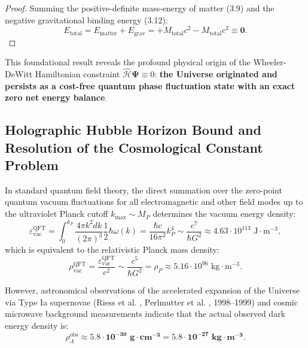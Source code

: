 \begin{proof}
Summing the positive-definite mass-energy of matter (3.9) and the negative gravitational binding energy (3.12):
\begin{equation}\label{eq:3.13}\tag{3.13}
E_{\text{total}} = E_{\text{matter}} + E_{\text{grav}} = +M_{\text{total}} c^2 - M_{\text{total}} c^2 \equiv \mathbf{0}.
\end{equation}
\end{proof}

This foundational result reveals the profound physical origin of the Wheeler-DeWitt Hamiltonian constraint $\hat{\mathcal{H}} \mathbf{\Psi} \equiv 0$: \textbf{the Universe originated and persists as a cost-free quantum phase fluctuation state with an exact zero net energy balance}.

\subsection{Holographic Hubble Horizon Bound and Resolution of the Cosmological Constant Problem}\label{sec:3.3}

In standard quantum field theory, the direct summation over the zero-point quantum vacuum fluctuations for all electromagnetic and other field modes up to the ultraviolet Planck cutoff $k_{\max} \sim M_P$ determines the vacuum energy density:
\begin{equation}\label{eq:3.14}\tag{3.14}
\varepsilon_{\text{vac}}^{\text{QFT}} = \int_0^{k_P} \frac{4\pi k^2 dk}{(2\pi)^3} \frac{1}{2}\hbar \omega(k) = \frac{\hbar c}{16\pi^2} k_P^4 \sim \frac{c^7}{\hbar G^2} \approx 4.63 \cdot 10^{113}\text{ J}\cdot\text{m}^{-3},
\end{equation}
which is equivalent to the relativistic Planck mass density:
\begin{equation}\label{eq:3.15}\tag{3.15}
\rho_{\text{vac}}^{\text{QFT}} = \frac{\varepsilon_{\text{vac}}^{\text{QFT}}}{c^2} \sim \frac{c^5}{\hbar G^2} = \rho_P \approx 5.16 \cdot 10^{96}\text{ kg}\cdot\text{m}^{-3}.
\end{equation}

However, astronomical observations of the accelerated expansion of the Universe via Type Ia supernovae (Riess et al. \cite{ref21}, Perlmutter et al. \cite{ref22}, 1998--1999) and cosmic microwave background measurements indicate that the actual observed dark energy density is:
\begin{equation}\label{eq:3.16}\tag{3.16}
\rho_{\Lambda}^{\text{obs}} \approx \mathbf{5.8 \cdot 10^{-30}\text{ g}\cdot\text{cm}^{-3}} = \mathbf{5.8 \cdot 10^{-27}\text{ kg}\cdot\text{m}^{-3}}.
\end{equation}

